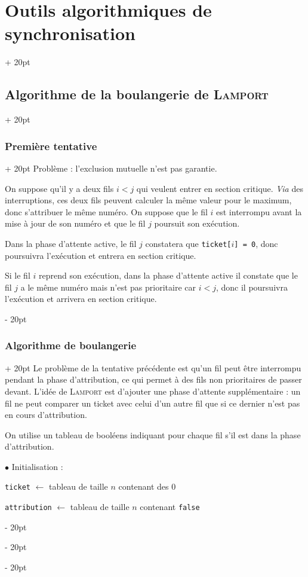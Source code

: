 \documentclass[a4paper, 12pt, twoside]{article}
\newcommand{\ind}[1][20pt]{\advance\leftskip + #1}
\newcommand{\deind}[1][20pt]{\advance\leftskip - #1}
\newenvironment{indt}[2][20pt]{#2 \par \ind[#1]}{\par \deind} %
\begin{document}
\begin{indt}{\section{Outils algorithmiques de synchronisation}}
\begin{indt}{\subsection{Algorithme de la boulangerie de \textsc{Lamport}}}
\begin{indt}{\subsubsection{Première tentative}}
                Problème : l'exclusion mutuelle n'est pas garantie.

                On suppose qu'il y a deux fils $i < j$ qui veulent entrer en section critique.
                \textit{Via} des interruptions, ces deux fils peuvent calculer la même valeur pour le maximum, donc s'attribuer le même numéro.
                On suppose que le fil $i$ est interrompu avant la mise à jour de son numéro et que le fil $j$ poursuit son exécution.

                Dans la phase d'attente active, le fil $j$ constatera que \texttt{ticket[$i$] = 0}, donc poursuivra l'exécution et entrera en section critique.

                Si le fil $i$ reprend son exécution, dans la phase d'attente active il constate que le fil $j$ a le même numéro mais n'est pas prioritaire car $i < j$, donc il poursuivra l'exécution et arrivera en section critique.
            \end{indt}

            \vspace{12pt}
            
            \begin{indt}{\subsubsection{Algorithme de boulangerie}}
                Le problème de la tentative précédente est qu'un fil peut être interrompu pendant la phase d'attribution, ce qui permet à des fils non prioritaires de passer devant.
                L'idée de \textsc{Lamport} est d'ajouter une phase d'attente supplémentaire : un fil ne peut comparer un ticket avec celui d'un autre fil que si ce dernier n'est pas en cours d'attribution.

                \vspace{6pt}
                
                On utilise un tableau de booléens indiquant pour chaque fil s'il est dans la phase d'attribution.

                $\bullet$ Initialisation :

                \begin{emphBox}
                    \texttt{ticket} $\leftarrow$ tableau de taille $n$ contenant des 0

                    \texttt{attribution} $\leftarrow$ tableau de taille $n$ contenant \texttt{false}
                \end{emphBox}


\end{indt}
\end{indt}
\end{indt}
\end{document}
